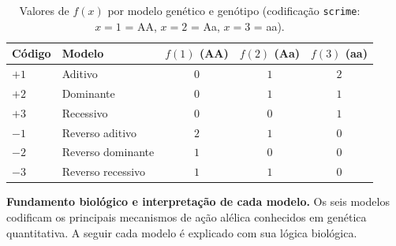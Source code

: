 \documentclass[
    12pt,
    a4paper,
    oneside,
    english,
    french,
    spanish,
    brazil
    ]{abntex2}
\renewcommand{\arraystretch}{1.3}
\newcommand{\novo}[1]{\textcolor{corNova}{#1}}
\begin{document}
\begin{table}[H]
\centering
\caption{\novo{Valores de $f(x)$ por modelo genético e genótipo (codificação \texttt{scrime}: $x=1$ = AA, $x=2$ = Aa, $x=3$ = aa).}}
\label{tab:fx_exemplos}
\small
\renewcommand{\arraystretch}{1.35}
\begin{tabular}{llccc}
\hline
\textbf{Código} & \textbf{Modelo} & \textbf{$f(1)$ (AA)} & \textbf{$f(2)$ (Aa)} & \textbf{$f(3)$ (aa)} \\
\hline
$+1$ & Aditivo             & $0$ & $1$ & $2$ \\
$+2$ & Dominante           & $0$ & $1$ & $1$ \\
$+3$ & Recessivo           & $0$ & $0$ & $1$ \\
$-1$ & Reverso aditivo     & $2$ & $1$ & $0$ \\
$-2$ & Reverso dominante   & $1$ & $0$ & $0$ \\
$-3$ & Reverso recessivo   & $1$ & $1$ & $0$ \\
\hline
\end{tabular}
\end{table}

\novo{\textbf{Fundamento biológico e interpretação de cada modelo.} Os seis modelos codificam os principais mecanismos de ação alélica conhecidos em genética quantitativa. A seguir cada modelo é explicado com sua lógica biológica.}
\end{document}
